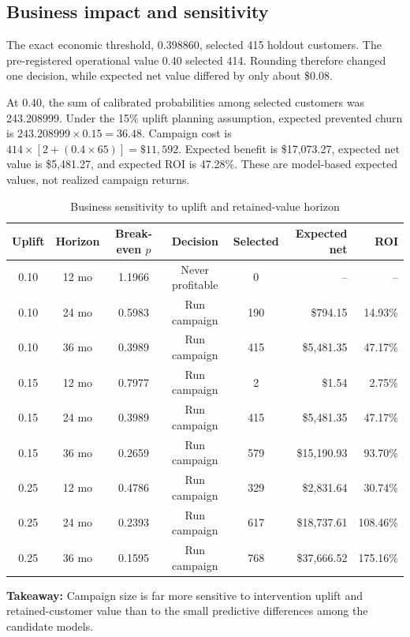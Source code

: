 \documentclass[11pt]{article}
\newcommand{\takeaway}[1]{\vspace{1pt}\noindent\textbf{Takeaway:} #1\vspace{3pt}}
\begin{document}
\subsection{Business impact and sensitivity}

The exact economic threshold, 0.398860, selected 415 holdout customers. The pre-registered operational value 0.40 selected 414. Rounding therefore changed one decision, while expected net value differed by only about \$0.08.

At 0.40, the sum of calibrated probabilities among selected customers was 243.208999. Under the 15\% uplift planning assumption, expected prevented churn is $243.208999\times0.15=36.48$. Campaign cost is $414\times[2+(0.4\times65)]=\$11,592$. Expected benefit is \$17,073.27, expected net value is \$5,481.27, and expected ROI is 47.28\%. These are model-based expected values, not realized campaign returns.

\begin{table}[H]
\centering\scriptsize
\caption{Business sensitivity to uplift and retained-value horizon}
\begin{tabular}{cccccrr}
\toprule
Uplift & Horizon & Break-even $p$ & Decision & Selected & Expected net & ROI \\
\midrule
0.10 & 12 mo & 1.1966 & Never profitable & 0 & -- & -- \\
0.10 & 24 mo & 0.5983 & Run campaign & 190 & \$794.15 & 14.93\% \\
0.10 & 36 mo & 0.3989 & Run campaign & 415 & \$5,481.35 & 47.17\% \\
0.15 & 12 mo & 0.7977 & Run campaign & 2 & \$1.54 & 2.75\% \\
0.15 & 24 mo & 0.3989 & Run campaign & 415 & \$5,481.35 & 47.17\% \\
0.15 & 36 mo & 0.2659 & Run campaign & 579 & \$15,190.93 & 93.70\% \\
0.25 & 12 mo & 0.4786 & Run campaign & 329 & \$2,831.64 & 30.74\% \\
0.25 & 24 mo & 0.2393 & Run campaign & 617 & \$18,737.61 & 108.46\% \\
0.25 & 36 mo & 0.1595 & Run campaign & 768 & \$37,666.52 & 175.16\% \\
\bottomrule
\end{tabular}
\end{table}
\takeaway{Campaign size is far more sensitive to intervention uplift and retained-customer value than to the small predictive differences among the candidate models.}
\end{document}
